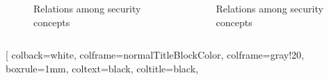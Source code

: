 \documentclass{beamer}
\begin{document}
\begin{frame}[fragile]{}
\begin{columns}[T]
\begin{column}{.49\textwidth}
\begin{tcolorbox}[adjusted title={\centering\large Security concepts}]
                \vspace{-.6em}
                \begin{columns}[c]
                    \begin{column}{.49\textwidth}
                        \begin{figure}[htb]
                            \resizebox{1.1\columnwidth}{!}{
                                
                            }
                            \vspace{-1.7cm}
                            \caption{Relations among security concepts}
                        \end{figure}
                    \end{column}
                    \begin{column}{.49\textwidth}
                        \begin{figure}[htb]
                            \vspace{-1em}
                            \resizebox{1.1\columnwidth}{!}{
                                
                            }
                            \vspace{-2.5cm}
                            \caption{Relations among security concepts}
                            \vspace{.75em}
                        \end{figure}
                    \end{column}
                \end{columns}
            \end{tcolorbox}
        \end{column}
    \end{columns}
    \vspace{.25em}
    \begin{tcolorbox}[adjusted title={\centering\large Formal Analysis of Industrial Protocols}]
        \vspace{.5em}
        \begin{columns}[T]
            \begin{column}{.35\textwidth}
                \begin{tcolorbox}[
                colback=white, %
                colframe=normalTitleBlockColor, %
                colframe=gray!20, %
                boxrule=1mm,
                coltext=black, %
                coltitle=black, %

\end{tcolorbox}
\end{column}
\end{columns}
\end{tcolorbox}
\end{frame}
\end{document}
